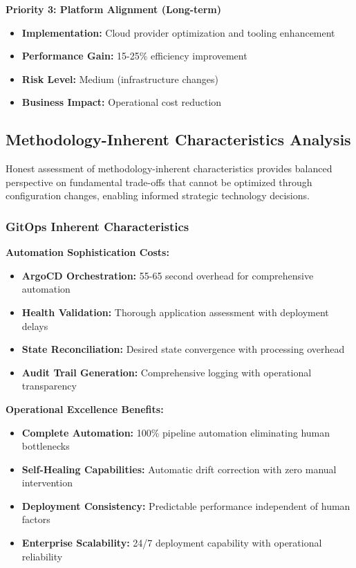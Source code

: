 \textbf{Priority 3: Platform Alignment (Long-term)}
\begin{itemize}
\item \textbf{Implementation:} Cloud provider optimization and tooling enhancement
\item \textbf{Performance Gain:} 15-25\% efficiency improvement
\item \textbf{Risk Level:} Medium (infrastructure changes)
\item \textbf{Business Impact:} Operational cost reduction
\end{itemize}

\subsection{Methodology-Inherent Characteristics Analysis}
\label{subsec:methodology_characteristics}

Honest assessment of methodology-inherent characteristics provides balanced perspective on fundamental trade-offs that cannot be optimized through configuration changes, enabling informed strategic technology decisions.

\subsubsection{GitOps Inherent Characteristics}

\textbf{Automation Sophistication Costs:}
\begin{itemize}
\item \textbf{ArgoCD Orchestration:} 55-65 second overhead for comprehensive automation
\item \textbf{Health Validation:} Thorough application assessment with deployment delays
\item \textbf{State Reconciliation:} Desired state convergence with processing overhead
\item \textbf{Audit Trail Generation:} Comprehensive logging with operational transparency
\end{itemize}

\textbf{Operational Excellence Benefits:}
\begin{itemize}
\item \textbf{Complete Automation:} 100\% pipeline automation eliminating human bottlenecks
\item \textbf{Self-Healing Capabilities:} Automatic drift correction with zero manual intervention
\item \textbf{Deployment Consistency:} Predictable performance independent of human factors
\item \textbf{Enterprise Scalability:} 24/7 deployment capability with operational reliability
\end{itemize}

